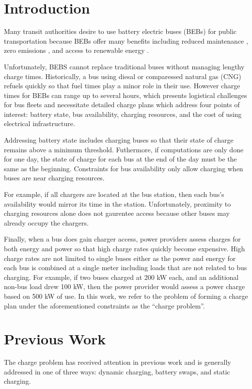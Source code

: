\section{Introduction}
\par  Many transit authorities desire to use battery electric buses (BEBs) for public transportation because BEBs offer many benefits \cite{Mahmoud2016} including reduced maintenance \cite{poornesh_comparative_2020}, zero emissions \cite{kato_comparative_2013}, and access to renewable energy \cite{cheng_smart_2020}.
\par Unfortunately, BEBS cannot replace traditional buses without managing lengthy charge times. Historically, a bus using diesal or comparessed natural gas (CNG) refuels quickly so that fuel times play a minor role in their use. However charge times for BEBs can range up to several hours, which presents logistical challenges for bus fleets and necessitate detailed charge plans which address four points of interest: battery state, bus availability, charging resources, and the cost of using electrical infrastructure. 
\par Addressing battery state includes charging buses so that their state of charge remains above a minimum threshold. Futhermore, if computations are only done for one day, the state of charge for each bus at the end of the day must be the same as the beginning. Constraints for bus availability only allow charging when buses are near charging resources. 
\par For example, if all chargers are located at the bus station, then each bus's availability would mirror its time in the station. Unfortunately, proximity to charging resources alone does not gaurentee access because other buses may already occupy the chargers. 
\par Finally, when a bus does gain charger access, power providers assess charges for both energy and power so that high charge rates quickly become expensive. High charge rates are not limited to single buses either as the power and energy for each bus is combined at a single meter including loads that are not related to bus charging. For example, if two buses charged at 200 kW each, and an additional non-bus load drew 100 kW, then the power provider would assess a power charge based on 500 kW of use. In this work, we refer to the problem of forming a charge plan under the aforementioned constraints as the ``charge problem''.
\section{Previous Work}
\par The charge problem has received attention in previous work and is generally addressed in one of three ways: dynamic charging, battery swaps, and static charging.
